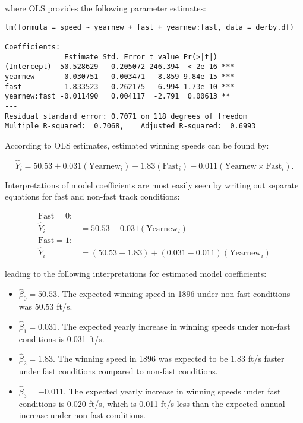 \documentclass[
]{krantz}
\providecommand{\tightlist}{%
  \setlength{\itemsep}{0pt}\setlength{\parskip}{0pt}}
\begin{document}
where OLS provides the following parameter estimates:

\begin{verbatim}
lm(formula = speed ~ yearnew + fast + yearnew:fast, data = derby.df)

Coefficients:
              Estimate Std. Error t value Pr(>|t|)    
(Intercept)  50.528629   0.205072 246.394  < 2e-16 ***
yearnew       0.030751   0.003471   8.859 9.84e-15 ***
fast          1.833523   0.262175   6.994 1.73e-10 ***
yearnew:fast -0.011490   0.004117  -2.791  0.00613 ** 
---
Residual standard error: 0.7071 on 118 degrees of freedom
Multiple R-squared:  0.7068,    Adjusted R-squared:  0.6993 
\end{verbatim}

According to OLS estimates, estimated winning speeds can be found by:

\begin{equation}
 \hat{Y}_{i}=50.53+0.031(\textrm{Yearnew}_{i})+1.83(\textrm{Fast}_{i})-0.011(\textrm{Yearnew}\times\textrm{Fast}_{i}).
\label{eq:model5est}
\end{equation}

Interpretations of model coefficients are most easily seen by writing out separate equations for fast and non-fast track conditions:

\begin{align*}
 \textrm{Fast}=0: & \\
 \hat{Y}_{i} &= 50.53+0.031(\textrm{Yearnew}_{i}) \\
 \textrm{Fast}=1: & \\
 \hat{Y}_{i} &= (50.53+1.83)+(0.031-0.011)(\textrm{Yearnew}_{i})
 \end{align*}

leading to the following interpretations for estimated model coefficients:

\begin{itemize}
\tightlist
\item
  \(\hat{\beta}_{0} = 50.53\). The expected winning speed in 1896 under non-fast conditions was 50.53 ft/s.
\item
  \(\hat{\beta}_{1} = 0.031\). The expected yearly increase in winning speeds under non-fast conditions is 0.031 ft/s.
\item
  \(\hat{\beta}_{2} = 1.83\). The winning speed in 1896 was expected to be 1.83 ft/s faster under fast conditions compared to non-fast conditions.
\item
  \(\hat{\beta}_{3} = -0.011\). The expected yearly increase in winning speeds under fast conditions is 0.020 ft/s, which is 0.011 ft/s less than the expected annual increase under non-fast conditions.
\end{itemize}
\end{document}
